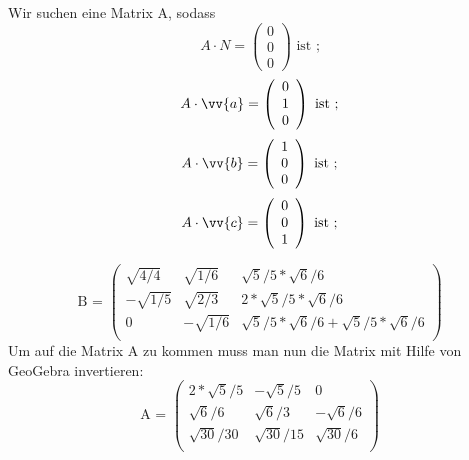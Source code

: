 Wir suchen eine Matrix A, sodass
$$ A\cdot N=\left(\begin{array}{c} 
     0\\0\\0\end{array}\right)\mbox{ ist ;} $$
     $$A\cdot \vv{a}=\left(\begin{array}{c} 
     0\\1\\0\end{array}\right)\mbox{ ist ;} $$
     $$A\cdot \vv{b}=\left(\begin{array}{c} 
     1\\0\\0\end{array}\right)\mbox{ ist ;} $$
     $$A\cdot \vv{c}=\left(\begin{array}{c} 
     0\\0\\1\end{array}\right)\mbox{ ist ;} $$
     
$$\mbox{B = } \left(\begin{array}{ccc}
\sqrt{4/4}&\sqrt{1/6}&\sqrt{5}/5*\sqrt{6}/6\\
-\sqrt{1/5}&\sqrt{2/3}&2*\sqrt{5}/5*\sqrt{6}/6\\
0&-\sqrt{1/6}&\sqrt{5}/5*\sqrt{6}/6+ \sqrt{5}/5*\sqrt{6}/6\\
\end{array}\right)$$
Um auf die Matrix A zu kommen muss man nun die Matrix mit Hilfe von GeoGebra invertieren:
$$\mbox{A = }\left(\begin{array}{ccc}
2*\sqrt{5}/5&-\sqrt{5}/5&0\\
\sqrt{6}/6&\sqrt{6}/3&-\sqrt{6}/6\\
\sqrt{30}/30&\sqrt{30}/15&\sqrt{30}/6\\
\end{array}\right)$$
